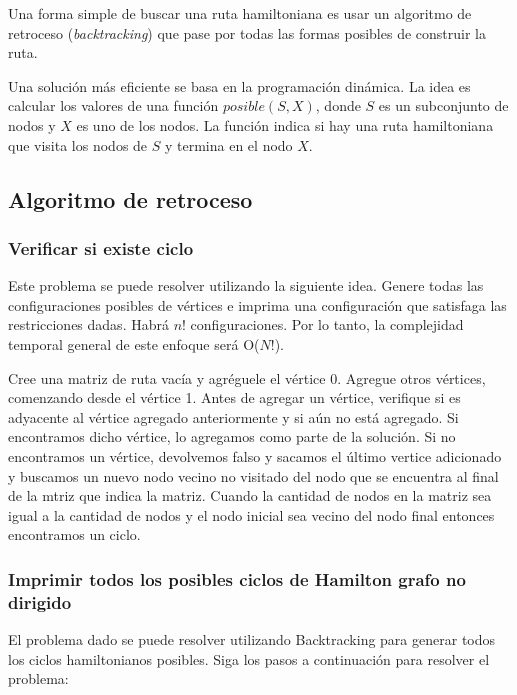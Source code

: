 Una forma simple de buscar una ruta hamiltoniana es usar un algoritmo de retroceso (\emph{backtracking}) que pase por todas las formas posibles de construir la ruta.

Una solución más eficiente se basa en la programación dinámica. La idea es calcular los valores de una función $posible(S, X)$, donde $S$ es un subconjunto de nodos y $X$ es uno de los nodos. La función indica si hay una ruta hamiltoniana que visita los nodos de $S$ y termina en el nodo $X$.

\subsection{Algoritmo de retroceso}

\subsubsection{Verificar si existe ciclo}
Este problema se puede resolver utilizando la siguiente idea. Genere todas las configuraciones posibles de vértices e imprima una configuración que satisfaga las restricciones dadas. Habrá $n!$ configuraciones. Por lo tanto, la complejidad temporal general de este enfoque será O($N!$). 

Cree una matriz de ruta vacía y agréguele el vértice 0. Agregue otros vértices, comenzando desde el vértice 1. Antes de agregar un vértice, verifique si es adyacente al vértice agregado anteriormente y si aún no está agregado. Si encontramos dicho vértice, lo agregamos como parte de la solución. Si no encontramos un vértice, devolvemos falso y sacamos el último vertice adicionado y buscamos un nuevo nodo vecino no visitado del nodo que se encuentra al final de la mtriz que indica la matriz. Cuando la cantidad de nodos en la matriz sea igual a la cantidad de nodos y el nodo inicial sea vecino del nodo final entonces encontramos un ciclo.

\subsubsection{Imprimir todos los posibles ciclos de Hamilton grafo no dirigido}
El problema dado se puede resolver utilizando Backtracking para generar todos los ciclos hamiltonianos posibles. Siga los pasos a continuación para resolver el problema:


